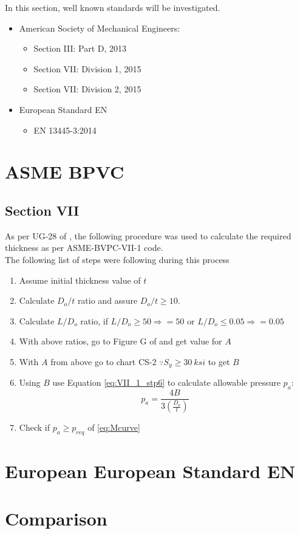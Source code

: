 
In this section, well known standards will be investigated.

\begin{itemize}
    \item American Society of Mechanical Engineers:
	    \begin{itemize}[label=$\bullet$]
	       	\item Section III: Part D, 2013	\citep{ASMEbvpcIID}
	    	\item Section VII: Division 1, 2015 \citep{ASMEbvpcVII1}
	    	\item Section VII: Division 2, 2015 \citep{ASMEbvpcVII2}
	    \end{itemize}
    \item European Standard EN
        \begin{itemize}[label=$\bullet$]
	       	\item EN 13445-3:2014
	    \end{itemize}
\end{itemize}

\section{ASME BPVC}

\subsection{Section VII}
As per UG-28 of \citep{ASMEbvpcVII1}, the following procedure was used to calculate the required thickness as per ASME-BVPC-VII-1 code.\\

The following list of steps were following during this process

\begin{enumerate}
	\item Assume initial thickness value of $t$
	\item Calculate $D_o/t$ ratio and assure $D_o/t \geq 10$.
	\item Calculate $L/D_o$ ratio, if $L/D_o \geq 50 \Rightarrow =50$ or  $L/D_o \leq 0.05 \Rightarrow =0.05$
	\item With above ratios, go to Figure G of \citep{ASMEbvpcIID} and get value for $A$
	\item With $A$ from above go to chart CS-2 $\because S_y \geq 30 \ ksi$ to get $B$
	\item Using $B$ use Equation \ref{eq:VII_1_stp6} to calculate allowable pressure $p_a$:
		\begin{equation}
			\label{eq:VII_1_stp6}
			p_a = \frac{4B}{3 \left(\frac{D_o}{t} \right)}
		\end{equation}
	\item Check if $p_a \geq p_{req}$ of \ref{eq:Mcurve}
	
\end{enumerate}

\section{European European Standard EN}

\section{Comparison}

